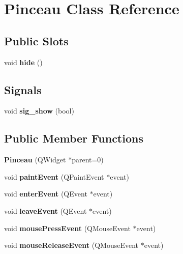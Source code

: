 \hypertarget{class_pinceau}{\section{\-Pinceau \-Class \-Reference}
\label{class_pinceau}
}
\subsection*{\-Public \-Slots}
\begin{DoxyCompactItemize}
\item 
\hypertarget{class_pinceau_ad3b17fafb09337792651808f49d1bbf6}{void {\bfseries hide} ()}\label{class_pinceau_ad3b17fafb09337792651808f49d1bbf6}

\end{DoxyCompactItemize}
\subsection*{\-Signals}
\begin{DoxyCompactItemize}
\item 
\hypertarget{class_pinceau_aa055a6a5089a35c06795bafca9a63d93}{void {\bfseries sig\-\_\-show} (bool)}\label{class_pinceau_aa055a6a5089a35c06795bafca9a63d93}

\end{DoxyCompactItemize}
\subsection*{\-Public \-Member \-Functions}
\begin{DoxyCompactItemize}
\item 
\hypertarget{class_pinceau_ae50676ed7dff22d8490348ede63478d6}{{\bfseries \-Pinceau} (\-Q\-Widget $\ast$parent=0)}\label{class_pinceau_ae50676ed7dff22d8490348ede63478d6}

\item 
\hypertarget{class_pinceau_af72110300f2df8f90c3c95589d640d50}{void {\bfseries paint\-Event} (\-Q\-Paint\-Event $\ast$event)}\label{class_pinceau_af72110300f2df8f90c3c95589d640d50}

\item 
\hypertarget{class_pinceau_a1a342bba7e6a2cd1626430dcc06c6a07}{void {\bfseries enter\-Event} (\-Q\-Event $\ast$event)}\label{class_pinceau_a1a342bba7e6a2cd1626430dcc06c6a07}

\item 
\hypertarget{class_pinceau_a77fe16191c682dc2f2509941dbcf743b}{void {\bfseries leave\-Event} (\-Q\-Event $\ast$event)}\label{class_pinceau_a77fe16191c682dc2f2509941dbcf743b}

\item 
\hypertarget{class_pinceau_aa5cceec03c9fe3696573aefcf26cbf38}{void {\bfseries mouse\-Press\-Event} (\-Q\-Mouse\-Event $\ast$event)}\label{class_pinceau_aa5cceec03c9fe3696573aefcf26cbf38}

\item 
\hypertarget{class_pinceau_affbf8ebc2d9985d61e70151cb039aa41}{void {\bfseries mouse\-Release\-Event} (\-Q\-Mouse\-Event $\ast$event)}\label{class_pinceau_affbf8ebc2d9985d61e70151cb039aa41}

\end{DoxyCompactItemize}
